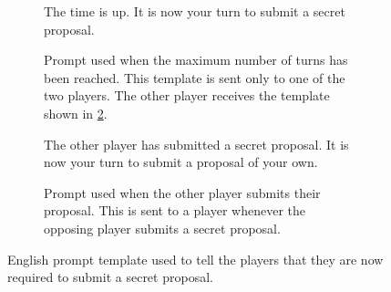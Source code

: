 \documentclass[../main.tex]{subfiles}
\begin{document}
\begin{figure}
\begin{subfigure}[t]{0.48\textwidth}
\begin{prompt}
The time is up. It is now your turn to submit a secret proposal.
    \end{prompt}
    \caption{Prompt used when the maximum number of turns has been reached. This template is sent only to one of the two players. The other player receives the template shown in \cref{fig:dond_prompt_template_early}.}
    \label{fig:dond_prompt_template_timeout}
  \end{subfigure}
  \hfill
  \begin{subfigure}[t]{0.48\textwidth}
    \centering
    \begin{prompt}

The other player has submitted a secret proposal. It is now your turn to submit a proposal of your own.
    \end{prompt}
    \caption{Prompt used when the other player submits their proposal. This is sent to a player whenever the opposing player submits a secret proposal.}
    \label{fig:dond_prompt_template_early}
  \end{subfigure}
  \caption{English prompt template used to tell the players that they are now required to submit a secret proposal.}
  \label{fig:dond_prompt_template_all}
\end{figure}
\end{document}
